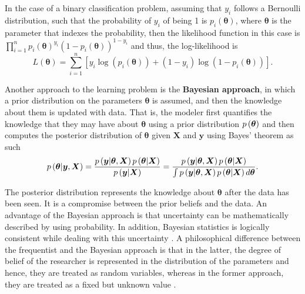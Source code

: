 In the case of a binary classification problem, assuming that $y_i$ follows a Bernoulli distribution, such that the probability of $y_i$ of being 1 is $p_i(\boldsymbol{\theta})$, where $\boldsymbol{\theta}$ is the parameter that indexes the probability, then the likelihood function in this case is $\prod_{i = 1}^n  p_i(\boldsymbol{\theta})^{y_i}\left(1 - p_i(\boldsymbol{\theta}) \right)^{1 - y_i}$ and thus, the log-likelihood is
\begin{equation}
  L(\boldsymbol{\theta}) = \sum_{i = 1}^n \left[ y_i \log\left( p_i(\boldsymbol{\theta}) \right) + (1 - y_i) \log \left( 1 - p_i(\boldsymbol{\theta}) \right) \right].
\end{equation}

Another approach to the learning problem is the \textbf{Bayesian approach}, in which a prior distribution on the parameters $\boldsymbol{\theta}$ is assumed, and then the knowledge about them is updated with data. That is, the modeler first quantifies the knowledge that they may have about $\boldsymbol{\theta}$ using a prior distribution $p\left( \boldsymbol{\theta} \right)$ and then computes the posterior distribution of $\boldsymbol{\theta}$ given $\boldsymbol{X}$ and $\boldsymbol{y}$ using Bayes' theorem as such
\begin{equation}
  \label{eq:bayes_theorem}
  p\left( \boldsymbol{\theta} | \boldsymbol{y}, \boldsymbol{X}  \right) = \frac{p\left( \boldsymbol{y} | \boldsymbol{\theta}, \boldsymbol{X} \right) p\left( \boldsymbol{\theta} | \boldsymbol{X} \right)}{p\left( \boldsymbol{y} | \boldsymbol{X} \right)} = \frac{p\left( \boldsymbol{y} | \boldsymbol{\theta}, \boldsymbol{X} \right) p\left( \boldsymbol{\theta} | \boldsymbol{X} \right)}{\int p\left( \boldsymbol{y} | \boldsymbol{\theta}, \boldsymbol{X} \right) p\left( \boldsymbol{\theta} | \boldsymbol{X} \right) d\boldsymbol{\theta}}.
\end{equation}

The posterior distribution represents the knowledge about $\boldsymbol{\theta}$ after the data has been seen. It is a compromise between the prior beliefs and the data. An advantage of the Bayesian approach is that uncertainty can be mathematically described by using probability. In addition, Bayesian statistics is logically consistent while dealing with this uncertainty \cite{cox1946probability} \cite{cox1963algebra} \cite{jaynes2003probability} \cite{o2004advanced}. A philosophical difference between the frequentist and the Bayesian approach is that in the latter, the degree of belief of the researcher is represented in the distribution of the parameters and hence, they are treated as random variables, whereas in the former approach, they are treated as a fixed but unknown value \cite{o2004advanced}.

